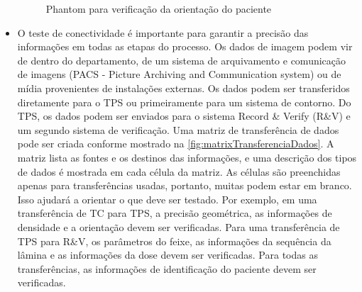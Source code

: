 \documentclass[11pt,a4paper]{article}
\newcounter{exemplo}
\begin{document}
\begin{itemize}[label=\textcolor{CarnationPink}{$\star$}]
		\begin{figure}[!h]
			\centering
			\caption{Phantom para verificação da orientação do paciente}
			\label{fig:phantomOrientacaoPaciente}
		\end{figure}
	
		\item O teste de conectividade é importante para garantir a precisão das informações em todas as etapas do processo. Os dados de imagem podem vir de dentro do departamento, de um sistema de arquivamento e comunicação de imagens (PACS - Picture Archiving and Communication system) ou de mídia provenientes de instalações externas. Os dados podem ser transferidos diretamente para o TPS ou primeiramente para um sistema de contorno. Do TPS, os dados podem ser enviados para o sistema Record \& Verify (R\&V) e um segundo sistema de verificação. Uma matriz de transferência de dados pode ser criada conforme mostrado na \ref{fig:matrixTransferenciaDados}. A matriz lista as fontes e os destinos das informações, e uma descrição dos tipos de dados é mostrada em cada célula da matriz. As células são preenchidas apenas para transferências usadas, portanto, muitas podem estar em branco. Isso ajudará a orientar o que deve ser testado. Por exemplo, em uma transferência de TC para TPS, a precisão geométrica, as informações de densidade e a orientação devem ser verificadas. Para uma transferência de TPS para R\&V, os parâmetros do feixe, as informações da sequência da lâmina e as informações da dose devem ser verificadas. Para todas as transferências, as informações de identificação do paciente devem ser verificadas.
		

\end{itemize}
\end{document}
